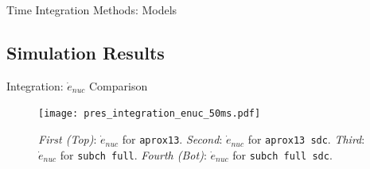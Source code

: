 \documentclass[
	11pt, %
]{beamer}
\begin{document}
\begin{frame}{Time Integration Methods: Models}

    
    
    \begin{table}
        \caption{This table shows the various settings used for each simulation.}
    \end{table}
    
\end{frame}

\subsection{Simulation Results}

\begin{frame}{Integration: $\dot{e}_{nuc}$ Comparison}
    \begin{figure}
        \centering
        \texttt{[image: pres\_integration\_enuc\_50ms.pdf]}
        \caption{{\it First (Top)}: $\dot{e}_{nuc}$ for {\tt aprox13}. {\it Second}: $\dot{e}_{nuc}$ for {\tt aprox13 sdc}. {\it Third}: $\dot{e}_{nuc}$ for {\tt subch full}. {\it Fourth (Bot)}: $\dot{e}_{nuc}$ for {\tt subch full sdc}.}
    \end{figure}
\end{frame}
\end{document}
